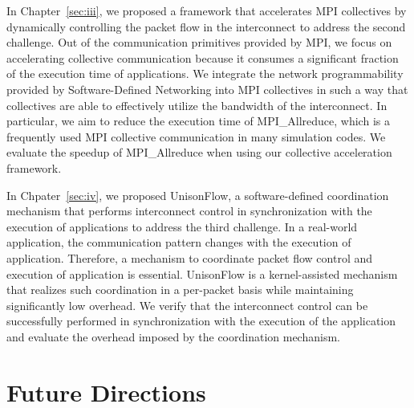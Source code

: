 In Chapter~\ref{sec:iii}, we proposed a framework that accelerates MPI
collectives by dynamically controlling the packet flow in the interconnect to
address the second challenge. Out of the communication primitives provided by
MPI, we focus on accelerating collective communication because it consumes a
significant fraction of the execution time of applications. We integrate the
network programmability provided by Software-Defined Networking into MPI
collectives in such a way that collectives are able to effectively utilize the
bandwidth of the interconnect. In particular, we aim to reduce the execution
time of MPI\_Allreduce, which is a frequently used MPI collective
communication in many simulation codes. We evaluate the speedup of
MPI\_Allreduce when using our collective acceleration framework.

In Chpater~\ref{sec:iv}, we proposed UnisonFlow, a software-defined
coordination mechanism that performs interconnect control in synchronization
with the execution of applications to address the third challenge. In a
real-world application, the communication pattern changes with the execution
of application. Therefore, a mechanism to coordinate packet flow control and
execution of application is essential. UnisonFlow is a kernel-assisted
mechanism that realizes such coordination in a per-packet basis while
maintaining significantly low overhead. We verify that the interconnect
control can be successfully performed in synchronization with the execution of
the application and evaluate the overhead imposed by the coordination
mechanism.

\section{Future Directions}

